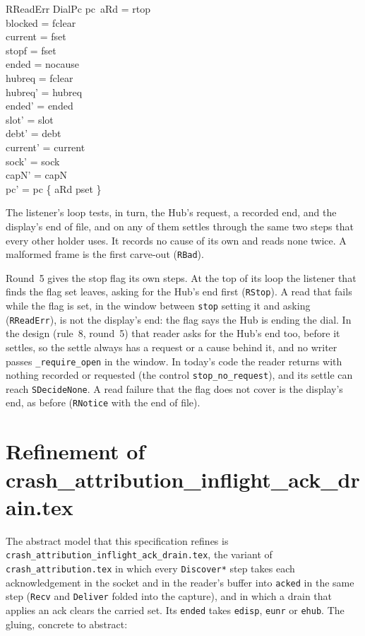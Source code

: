 \documentclass[a4paper,10pt,fleqn]{article}
\begin{document}
\begin{schema}{RReadErr}
  DialPc
\where
  pc~aRd = rtop \\
  blocked = fclear \\
  current = fset \\
  stopf = fset \\
  ended = nocause \\
  hubreq = fclear \\
  hubreq' = hubreq \\
  ended' = ended \\
  slot' = slot \\
  debt' = debt \\
  current' = current \\
  sock' = sock \\
  capN' = capN \\
  pc' = pc \oplus \{ aRd \mapsto pset \}
\end{schema}

The listener's loop tests, in turn, the Hub's request, a
recorded end, and the display's end of file, and on any of them settles through
the same two steps that every other holder uses.  It records no cause of its
own and reads none twice.  A malformed frame is the first carve-out
(\texttt{RBad}).

Round~5 gives the stop flag its own steps.  At the top of its loop the listener
that finds the flag set leaves, asking for the Hub's end first (\texttt{RStop}).
A read that fails while the flag is set, in the window between \texttt{stop}
setting it and asking (\texttt{RReadErr}), is not the display's end: the flag
says the Hub is ending the dial.  In the design (rule~8, round~5) that reader asks
for the Hub's end too, before it settles, so the settle always has a request or a
cause behind it, and no writer passes \texttt{\_require\_open} in the window.  In
today's code the reader returns with nothing recorded or requested (the control
\texttt{stop\_no\_request}), and its settle can reach \texttt{SDecideNone}.  A
read failure that the flag does not cover is the display's end, as before
(\texttt{RNotice} with the end of file).

\section{Refinement of crash\_attribution\_inflight\_ack\_drain.tex}

The abstract model that this specification refines is
\texttt{crash\_attribution\_inflight\_ack\_drain.tex}, the variant of
\texttt{crash\_attribution.tex} in which every \texttt{Discover*} step takes each
acknowledgement in the socket and in the reader's buffer into \texttt{acked} in
the same step (\texttt{Recv} and \texttt{Deliver} folded into the capture), and
in which a drain that applies an ack clears the carried set.  Its \texttt{ended}
takes \texttt{edisp}, \texttt{eunr} or \texttt{ehub}.  The gluing, concrete to
abstract:
\end{document}
